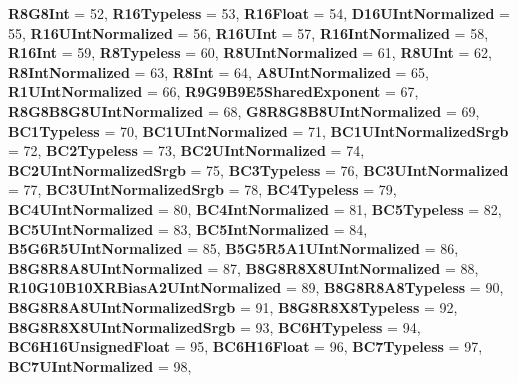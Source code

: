 \begin{DoxyCompactItemize}
{\bfseries R8\+G8\+Int} = 52, 
{\bfseries R16\+Typeless} = 53, 
\newline
{\bfseries R16\+Float} = 54, 
{\bfseries D16\+U\+Int\+Normalized} = 55, 
{\bfseries R16\+U\+Int\+Normalized} = 56, 
{\bfseries R16\+U\+Int} = 57, 
\newline
{\bfseries R16\+Int\+Normalized} = 58, 
{\bfseries R16\+Int} = 59, 
{\bfseries R8\+Typeless} = 60, 
{\bfseries R8\+U\+Int\+Normalized} = 61, 
\newline
{\bfseries R8\+U\+Int} = 62, 
{\bfseries R8\+Int\+Normalized} = 63, 
{\bfseries R8\+Int} = 64, 
{\bfseries A8\+U\+Int\+Normalized} = 65, 
\newline
{\bfseries R1\+U\+Int\+Normalized} = 66, 
{\bfseries R9\+G9\+B9\+E5\+Shared\+Exponent} = 67, 
{\bfseries R8\+G8\+B8\+G8\+U\+Int\+Normalized} = 68, 
{\bfseries G8\+R8\+G8\+B8\+U\+Int\+Normalized} = 69, 
\newline
{\bfseries B\+C1\+Typeless} = 70, 
{\bfseries B\+C1\+U\+Int\+Normalized} = 71, 
{\bfseries B\+C1\+U\+Int\+Normalized\+Srgb} = 72, 
{\bfseries B\+C2\+Typeless} = 73, 
\newline
{\bfseries B\+C2\+U\+Int\+Normalized} = 74, 
{\bfseries B\+C2\+U\+Int\+Normalized\+Srgb} = 75, 
{\bfseries B\+C3\+Typeless} = 76, 
{\bfseries B\+C3\+U\+Int\+Normalized} = 77, 
\newline
{\bfseries B\+C3\+U\+Int\+Normalized\+Srgb} = 78, 
{\bfseries B\+C4\+Typeless} = 79, 
{\bfseries B\+C4\+U\+Int\+Normalized} = 80, 
{\bfseries B\+C4\+Int\+Normalized} = 81, 
\newline
{\bfseries B\+C5\+Typeless} = 82, 
{\bfseries B\+C5\+U\+Int\+Normalized} = 83, 
{\bfseries B\+C5\+Int\+Normalized} = 84, 
{\bfseries B5\+G6\+R5\+U\+Int\+Normalized} = 85, 
\newline
{\bfseries B5\+G5\+R5\+A1\+U\+Int\+Normalized} = 86, 
{\bfseries B8\+G8\+R8\+A8\+U\+Int\+Normalized} = 87, 
{\bfseries B8\+G8\+R8\+X8\+U\+Int\+Normalized} = 88, 
{\bfseries R10\+G10\+B10\+X\+R\+Bias\+A2\+U\+Int\+Normalized} = 89, 
\newline
{\bfseries B8\+G8\+R8\+A8\+Typeless} = 90, 
{\bfseries B8\+G8\+R8\+A8\+U\+Int\+Normalized\+Srgb} = 91, 
{\bfseries B8\+G8\+R8\+X8\+Typeless} = 92, 
{\bfseries B8\+G8\+R8\+X8\+U\+Int\+Normalized\+Srgb} = 93, 
\newline
{\bfseries B\+C6\+H\+Typeless} = 94, 
{\bfseries B\+C6\+H16\+Unsigned\+Float} = 95, 
{\bfseries B\+C6\+H16\+Float} = 96, 
{\bfseries B\+C7\+Typeless} = 97, 
\newline
{\bfseries B\+C7\+U\+Int\+Normalized} = 98, 

\end{DoxyCompactItemize}

